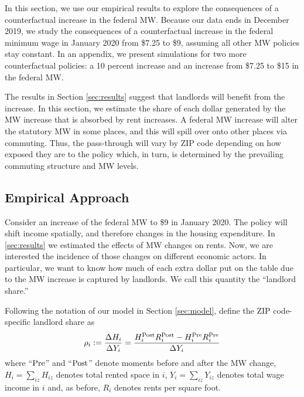 
In this section, we use our empirical results to explore the consequences of 
a counterfactual increase in the federal MW.
Because our data ends in December 2019, we study the consequences of a 
counterfactual increase in the federal minimum wage in January 2020 from 
\$7.25 to \$9, assuming all other MW policies stay constant. 
In an appendix, we present simulations for two more counterfactual policies: 
a 10 percent increase and an increase from \$7.25 to \$15 in the federal MW.

The results in Section \ref{sec:results} suggest that landlords will benefit
from the increase. 
In this section, we estimate the share of each dollar generated by the MW 
increase that is absorbed by rent increases.
A federal MW increase will alter the statutory MW in some places, and this will
spill over onto other places via commuting.
Thus, the pass-through will vary by ZIP code depending on how exposed they
are to the policy which, in turn, is determined by the prevailing commuting
structure and MW levels.


\subsection{Empirical Approach}\label{sec:emp_cf}

Consider an increase of the federal MW to \$9 in January 2020.
The policy will shift income spatially, and therefore changes in 
the housing expenditure.
In \ref{sec:results} we estimated the effects of MW changes on rents.
Now, we are interested the incidence of those changes on different economic
actors.
In particular, we want to know how much of each extra dollar put on the table 
due to the MW increase is captured by landlords.
We call this quantity the ``landlord share.''

Following the notation of our model in Section \ref{sec:model}, define the 
ZIP code-specific landlord share as
\begin{equation*}\label{eq:share_landlords}
    \rho_i := \frac{\Delta H_i}{\Delta Y_i} 
            = \frac{H^{\text{Post}}_i R^{\text{Post}}_i - H^{\text{Pre}}_i R^{\text{Pre}}_i}{\Delta Y_i} 
\end{equation*}
where
``$\text{Pre}$'' and ``$\text{Post}$'' denote moments before and after the MW change,
$H_i = \sum_{iz} H_{iz}$ denotes total rented space in $i$, 
$Y_i = \sum_{iz} Y_{iz}$ denotes total wage income in $i$ 
and, as before,
$R_i$ denotes rents per square foot.

